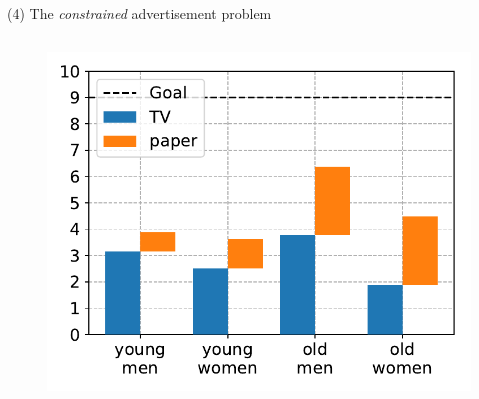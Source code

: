 \documentclass[11pt, aspectratio=149]{beamer}
\theoremstyle{plain}
\begin{document}
\begin{frame}[fragile, t]{(4) The \emph{constrained} advertisement problem}
\begin{columns}
\begin{column}{0.5\textwidth}
			\vspace*{-1.8em}
			\begin{figure}
				\centering
				\includegraphics[width=0.8\linewidth]{figs/advertisement_statement_constr_sol.pdf}
			\end{figure}
		\end{column}
	\end{columns}
\end{frame}


\end{document}
